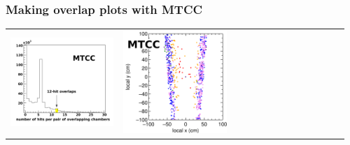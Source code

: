 \documentclass[compress]{beamer}
\begin{document}
\begin{frame}
\frametitle{Making overlap plots with MTCC}
\begin{tabular}{p{0.32\linewidth} p{0.32\linewidth} p{0.32\linewidth}}
\includegraphics[height=\linewidth]{num_hits_mtcc.png} &
\includegraphics[height=\linewidth]{overlap_positions_mtcc.png} &

\end{tabular}
\end{frame}
\end{document}
